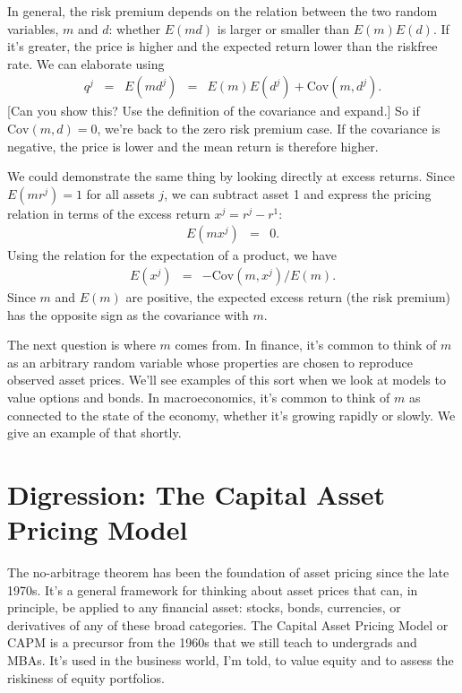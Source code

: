 \documentclass[11pt]{article}
\begin{document}
In general, the risk premium depends on the relation between
the two random variables, $m$ and $d$:
whether $E(md)$ is larger or smaller than $E(m) E(d)$.
If it's greater, the price is higher and the expected return lower
than the riskfree rate.
We can elaborate using
\begin{eqnarray*}
    q^j \;\;=\;\;    E(md^j) &=& E(m) E(d^j) + \mbox{Cov}(m,d^j).
\end{eqnarray*}
[Can you show this?  Use the definition of the covariance and expand.]
So if $\mbox{Cov}(m,d) =0$, we're back to the zero risk premium case.
If the covariance is negative, the price is lower and the mean return is therefore higher.

We could demonstrate the same thing by looking directly at excess returns.
Since $ E(mr^j) = 1$ for all assets $j$,
we can subtract asset 1 and express the pricing relation in terms
of the excess return $x^j = r^j - r^1 $:
\begin{eqnarray*}
    E( m x^j) &=& 0.
\end{eqnarray*}
Using the relation for the expectation of a product, we have
\begin{eqnarray*}
    E(x^j) &=& - \mbox{Cov}(m,x^j)/E(m) .
\end{eqnarray*}
Since $m$ and $E(m)$ are positive, the expected excess return
(the risk premium) has the opposite sign as the covariance with $m$.

The next question is where $m$ comes from.
In finance, it's common to think of $m$ as an arbitrary random variable
whose properties are chosen to reproduce observed asset prices.
We'll see examples of this sort when we look at models to value options and bonds.
In macroeconomics, it's common to think of $m$ as connected to
the state of the economy, whether it's growing rapidly or slowly.
We give an example of that shortly.


\section{Digression: The Capital Asset Pricing Model}

The no-arbitrage theorem has been the foundation of asset pricing since
the late 1970s.
It's a general framework for thinking about asset prices that can, in principle,
be applied to any financial asset:  stocks, bonds, currencies,
or derivatives of any of these broad categories.
The Capital Asset Pricing Model or CAPM is a precursor from the 1960s that
we still teach to undergrads and MBAs.
It's used in the business world, I'm told,
to value equity and to assess the riskiness of equity portfolios.
\end{document}
